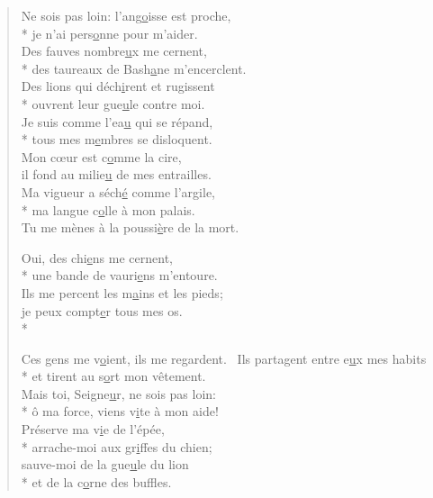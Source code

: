 \begin{verse}
Ne sois pas loin: l’ang\underline{o}isse est proche, \\*
je n’ai pers\underline{o}nne pour m’aider. \\
Des fauves nombre\underline{u}x me cernent, \\*
des taureaux de Bash\underline{a}ne m’encerclent. \\
Des lions qui déch\underline{i}rent et rugissent \\*
ouvrent leur gue\underline{u}le contre moi. \\

Je suis comme l’ea\underline{u} qui se répand, \\*
tous mes m\underline{e}mbres se disloquent. \\
Mon cœur est c\underline{o}mme la cire, \\
il fond au milie\underline{u} de mes entrailles. \\
Ma vigueur a séch\underline{é} comme l’argile, \\*
ma langue c\underline{o}lle à mon palais. \\

Tu me mènes à la poussi\underline{è}re de la mort.~\psalmdagger

Oui, des chi\underline{e}ns me cernent, \\*
une bande de vauri\underline{e}ns m’entoure. \\
Ils me percent les m\underline{a}ins et les pieds; \\
je peux compt\underline{e}r tous mes os. \\*

Ces gens me v\underline{o}ient, ils me regardent.~\psalmdagger
{}Ils partagent entre e\underline{u}x mes habits \\*
et tirent au s\underline{o}rt mon vêtement. \\

Mais toi, Seigne\underline{u}r, ne sois pas loin: \\*
ô ma force, viens v\underline{i}te à mon aide! \\
Préserve ma v\underline{i}e de l’épée, \\*
arrache-moi aux gr\underline{i}ffes du chien; \\
sauve-moi de la gue\underline{u}le du lion \\*
et de la c\underline{o}rne des buffles. \\


\end{verse}

